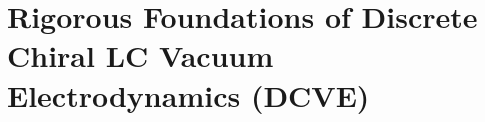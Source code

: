 \chapter{Rigorous Foundations of Discrete Chiral LC Vacuum Electrodynamics (DCVE)}
\label{ch:dcve}

